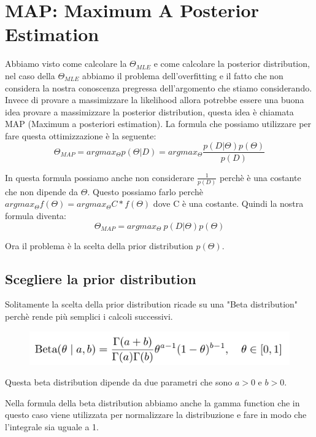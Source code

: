 \documentclass[14pt]{extreport}
\begin{document}
\section{MAP: Maximum A Posterior Estimation}

Abbiamo visto come calcolare la $\Theta_{MLE}$ e come calcolare la posterior distribution, nel caso della $\Theta_{MLE}$ abbiamo il problema
dell'overfitting e il fatto che non considera la nostra conoscenza pregressa dell'argomento che stiamo considerando. Invece di provare a massimizzare
la likelihood allora potrebbe essere una buona idea provare a massimizzare la posterior distribution, questa idea è chiamata MAP (Maximum a posteriori
estimation). La formula che possiamo utilizzare per fare questa ottimizzazione è la seguente: 
\begin{equation}
	\Theta_{MAP} = argmax_{\Theta} p(\Theta | D) = argmax_{\Theta} \frac{p(D|\Theta)p(\Theta)}{p(D)}
\end{equation}

In questa formula possiamo anche non considerare $\frac{1}{p(D)}$ perchè è una costante che non dipende da $\Theta$. Questo possiamo farlo perchè
$argmax_{\Theta} f(\Theta) = argmax_{\Theta} C *f(\Theta)$ dove C è una costante. Quindi la nostra formula diventa:
\begin{equation}
	\Theta_{MAP} = argmax_{\Theta} \ p(D|\Theta)p(\Theta)
\end{equation}

Ora il problema è la scelta della prior distribution $p(\Theta)$.

\subsection{Scegliere la prior distribution}

Solitamente la scelta della prior distribution ricade su una "Beta distribution" perchè rende più semplici i calcoli successivi.
\begin{figure}[H]
\centering
\includegraphics[width=0.7\linewidth]{34.jpeg}
\end{figure}

Questa beta distribution dipende da due parametri che sono $a>0$ e $b>0$.

Nella formula della beta distribution abbiamo anche la gamma function che in questo caso viene utilizzata per normalizzare la distribuzione e fare in
modo che l'integrale sia uguale a 1.
\end{document}
